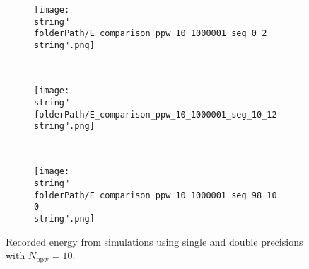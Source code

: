\begin{minipage}[t]{.5\textwidth}
%
\begin{figure}[H]
\captionsetup{width=0.95\textwidth,font=footnotesize,labelfont=footnotesize}
\centering
%
\begin{subfigure}[b]{1\textwidth}
%
\centering\texttt{[image: \\string"\\folderPath/E\_comparison\_ppw\_10\_1000001\_seg\_0\_2\\string".png]}
%
\end{subfigure}\hfill
\\[2ex]
%
\begin{subfigure}[b]{1\textwidth}
%
\centering\texttt{[image: \\string"\\folderPath/E\_comparison\_ppw\_10\_1000001\_seg\_10\_12\\string".png]}
%
\end{subfigure}\hfill
\\[2ex]
%
\begin{subfigure}[b]{1\textwidth}
%
\centering\texttt{[image: \\string"\\folderPath/E\_comparison\_ppw\_10\_1000001\_seg\_98\_100\\string".png]}
%
\end{subfigure}\hfill
%
\caption{Recorded energy from simulations using single and double precisions with $N_\text{ppw}=10$.}
\label{comparison_E_single_double_segments_ppw_10}
\end{figure}
%
\end{minipage}

